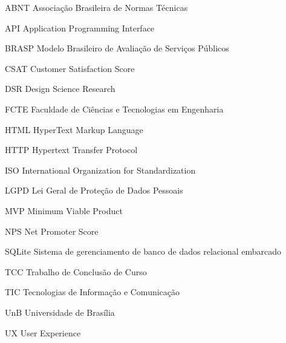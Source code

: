 \begin{siglas}
  \item[ABNT] Associação Brasileira de Normas Técnicas
  \item[API] Application Programming Interface
  \item[BRASP] Modelo Brasileiro de Avaliação de Serviços Públicos
  \item[CSAT] Customer Satisfaction Score
  \item[DSR] Design Science Research
  \item[FCTE] Faculdade de Ciências e Tecnologias em Engenharia
  \item[HTML] HyperText Markup Language
  \item[HTTP] Hypertext Transfer Protocol
  \item[ISO] International Organization for Standardization
  \item[LGPD] Lei Geral de Proteção de Dados Pessoais
  \item[MVP] Minimum Viable Product
  \item[NPS] Net Promoter Score
  \item[SQLite] Sistema de gerenciamento de banco de dados relacional embarcado
  \item[TCC] Trabalho de Conclusão de Curso
  \item[TIC] Tecnologias de Informação e Comunicação
  \item[UnB] Universidade de Brasília
  \item[UX] User Experience
\end{siglas}
